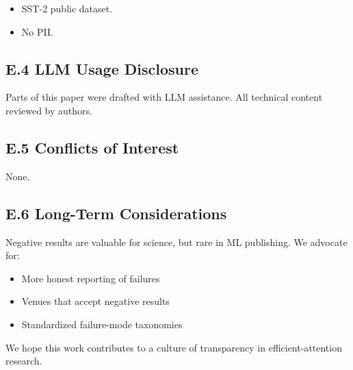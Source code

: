 \begin{itemize}
\item SST-2 public dataset.
\item No PII.

\end{itemize}
\subsection{E.4 LLM Usage Disclosure}

Parts of this paper were drafted with LLM assistance. All technical content 
reviewed by authors.

\subsection{E.5 Conflicts of Interest}

None.

\subsection{E.6 Long-Term Considerations}

Negative results are valuable for science, but rare in ML publishing. 
We advocate for:

\begin{itemize}
\item More honest reporting of failures
\item Venues that accept negative results
\item Standardized failure-mode taxonomies

\end{itemize}
We hope this work contributes to a culture of transparency in 
efficient-attention research.

